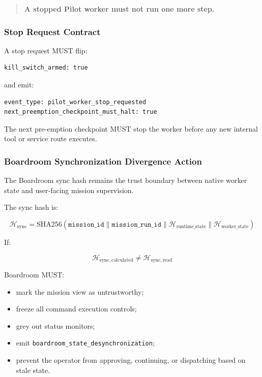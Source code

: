 \begin{quote}
\textbf{A stopped Pilot worker must not run one more step.}
\end{quote}

\subsubsection{Stop Request Contract}

A stop request MUST flip:

\begin{verbatim}
kill_switch_armed: true
\end{verbatim}

and emit:

\begin{verbatim}
event_type: pilot_worker_stop_requested
next_preemption_checkpoint_must_halt: true
\end{verbatim}

The next pre-emption checkpoint MUST stop the worker before any new internal tool or service route executes.

\subsubsection{Boardroom Synchronization Divergence Action}

The Boardroom sync hash remains the trust boundary between native worker state and user-facing mission supervision.

The sync hash is:

\begin{equation}
\mathcal{H}_{\mathrm{sync}}
=
\mathrm{SHA256}
(
\texttt{mission\_id}
\parallel
\texttt{mission\_run\_id}
\parallel
\mathcal{H}_{\mathrm{runtime\_state}}
\parallel
\mathcal{H}_{\mathrm{worker\_state}}
)
\end{equation}

If:

\begin{equation}
\mathcal{H}_{\mathrm{sync,calculated}}
\neq
\mathcal{H}_{\mathrm{sync,read}}
\end{equation}

Boardroom MUST:

\begin{itemize}
  \item mark the mission view as untrustworthy;
  \item freeze all command execution controls;
  \item grey out status monitors;
  \item emit \texttt{boardroom\_state\_desynchronization};
  \item prevent the operator from approving, continuing, or dispatching based on stale state.
\end{itemize}

